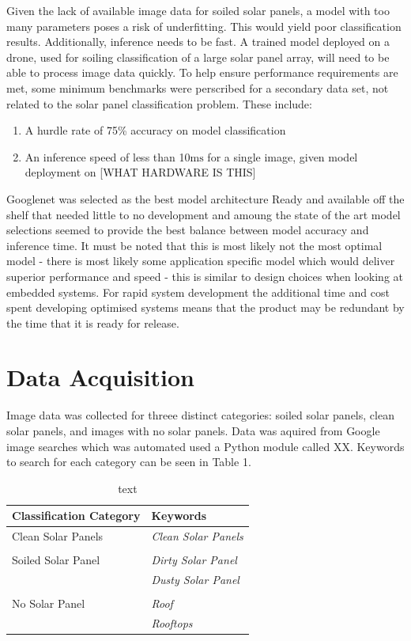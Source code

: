 \documentclass[10pt,journal,compsoc]{IEEEtran}
\begin{document}
		Given the lack of available image data for soiled solar panels, a model with too many parameters poses a risk of underfitting. This would yield poor classification results. Additionally, inference needs to be fast. A trained model deployed on a drone, used for soiling classification of a large solar panel array, will need to be able to process image data quickly. To help ensure performance requirements are met, some minimum benchmarks were perscribed for a secondary data set, not related to the solar panel classification problem. These include:
		\begin{enumerate}
			\item A hurdle rate of 75\% accuracy on model classification
			\item An inference speed of less than 10$\si{\milli\second}$ for a single image, given model deployment on [WHAT HARDWARE IS THIS]
		\end{enumerate}
		
		Googlenet was selected as the best model architecture Ready and available off the shelf that needed little to no development and amoung the state of the art model selections seemed to provide the best balance between model accuracy and inference time. It must be noted that this is most likely not the most optimal model - there is most likely some application specific model which would deliver superior performance and speed - this is similar to design choices when looking at embedded systems. For rapid system development the additional time and cost spent developing optimised systems means that the product may be redundant by the time that it is ready for release.
			
		\section{Data Acquisition}
		Image data was collected for threee distinct categories: soiled solar panels, clean solar panels, and images with no solar panels. Data was aquired from Google image searches which was automated used a Python module called XX. Keywords to search for each category can be seen in Table 1.
		\begin{table}[h]
			\centering
			\caption{text}
			\begin{tabular}{ll}
				\toprule
				\textbf{Classification Category} & \textbf{Keywords} \\
				\midrule
				Clean Solar Panels & \textit{Clean Solar Panels}\\
				 & \\
				Soiled Solar Panel & \textit{Dirty Solar Panel} \\
				 & \textit{Dusty Solar Panel} \\
				  & \\
				No Solar Panel & \textit{Roof} \\
				 & \textit{Rooftops} \\
				\bottomrule
			\end{tabular}
		\end{table}
		
\end{document}
